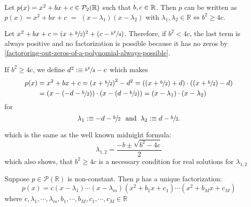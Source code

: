 \begin{thm} 
  \label{thm: factorization of a quadratic polynomial}
  Let $p(x)=x^2+bx+c \in \mathcal{P}_2(\mathbb{R})$ such that $b,c \in \mathbb{R}$. Then $p$ can be written as
  $p(x)=x^2 + bx + c$ $=$ $(x-\lambda_1)(x-\lambda_2)$ with $\lambda_1, \lambda_2 \in \mathbb{R} \iff b^2 \geq 4c$.
\end{thm}
\begin{prf}
  Let $x^2+bx+c=(x+\sfrac{b}{2})^2+(c-\sfrac{b^2}{4})$. Therefore, if $b^2<4c$, the last term is always positive and no factoriza\-tion is possible because it has no zeros by \ref{factororing-out-zeros-of-a-polynomial-always-possible}.

  If $b^2 \geq 4c$, we define $d^2 :\equiv \sfrac{b^2}{4}-c$ which makes
  \begin{equation}
	  \begin{aligned}
	    p(x)&=x^2+bx+c
		  = \left (x+\sfrac{b}{2} \right )^2-d^2
		  = \left ( (x+\sfrac{b}{2}) +d \right) \cdot \left ( (x+\sfrac{b}{2}) - d \right) \\
		  &= \left (x-(-d -\sfrac{b}{2}) \right) \cdot \left (x-(d-\sfrac{b}{2})\right)
		  =\left(x-\lambda_1 \right) \cdot \left(x-\lambda_2\right)
	  \end{aligned}
  \end{equation}
  for
  \begin{equation}
    \lambda_1 :\equiv -d-\sfrac{b}{2} \;\;\, \text{and}\;\; \lambda_2 :\equiv d-\sfrac{b}{2}.
  \end{equation}

  which is the same as the well known midnight formula:
  \begin{equation}
    \lambda_{1,2} = \frac{-b \pm \sqrt{b^2-4c}}{2}
  \end{equation}
  which also shows, that $b^2 \geq 4c$ is a necessary condition for real solutions for $\lambda_{1,2}$
\end{prf}

\begin{thm}
  Suppose $p \in \mathcal{P}(\mathbb{R})$ is non-constant. Then $p$ has a unique factorization:
  \begin{equation}
    p(x) = c(x-\lambda_1) \cdots (x-\lambda_m)(x^2+b_1x+c_1) \cdots (x^2+b_Mx+c_M)
  \end{equation}
  where $c, \lambda_1, \cdots, \lambda_m, b_1, \cdots, b_M, c_1, \cdots, c_M \in \mathbb{R}$
\end{thm}


